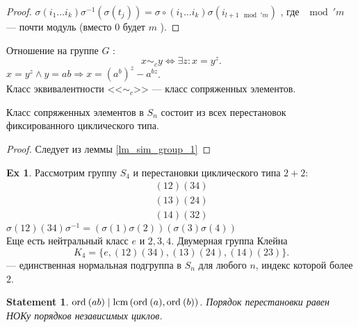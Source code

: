 \documentclass[11pt]{book}
\newcommand{\ord}{{\mathop{\text{\rm ord}}\:}}
\newcommand{\lcm}{{\mathop{\text{\rm lcm}}\,}}
\theoremstyle{definition}
\theoremstyle{plain}
\theoremstyle{plain}
\newtheorem{st}{Statement}
\theoremstyle{definition}
\newtheorem*{ex}{Ex}
\theoremstyle{remark}
\begin{document}
\begin{proof}
    $\sigma (i_1 \ldots i_k) \sigma ^{-1} (\sigma (t_j))=  \sigma \circ (i_1 \ldots i_k) \sigma  (i_{l+1 \mod' m})$
    , где $\mod' m$ --- почти модуль (вместо 0 будет $m$ ).
\end{proof}
\begin{defn}
    Отношение на группе $G$ :
    \[
	x \sim_c y \Longleftrightarrow  \exists z: x = y^z
    .\]
    $x=y^z \wedge y=ab \Longrightarrow  x = (a^b)^z - a^{bz}$.\\
    Класс эквивалентности <<$\sim_{c}$>> --- класс сопряженных элементов.
\end{defn}
\begin{thm}
    Класс сопряженных элементов в $S_n$ состоит из всех перестановок  фиксированного циклического типа.
\end{thm}
\begin{proof}
    Следует из леммы \ref{lm_sim_group_1}
\end{proof}
\begin{ex}
    Рассмотрим группу $S_4$ и перестановки циклического типа $2+2$:
    \[
	\begin{array}{c}
	    (12)(34)\\
	    (13)(24)\\
	    (14)(32)
	\end{array}
    \]
    $\sigma (12)(34) \sigma ^{-1} = (\sigma (1) \sigma (2))(\sigma (3) \sigma (4))$\\
    Еще есть нейтральный класс $e$ и $2, 3, 4$.
    Двумерная группа Клейна
    \[
	K_4 =  \{e, (12)(34), (13)(24), (14)(23)\}
    .\]  --- единственная нормальная подгруппа в $S_n$ для любого $n$, индекс которой более $2$.
\end{ex}
\begin{st}
    $\ord(ab) \mid \lcm (\ord(a), \ord(b))$.
    Порядок перестановки равен НОКу порядков независимых циклов.
\end{st}
\end{document}
